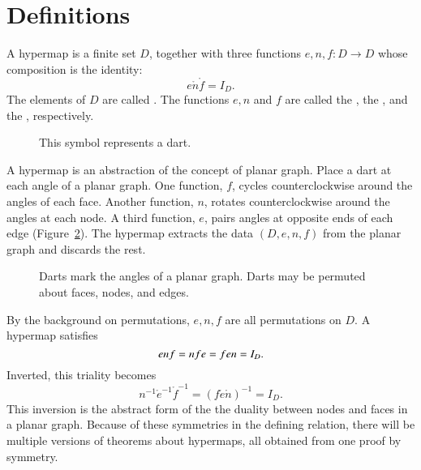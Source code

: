 \section{Definitions}



\begin{definition}\label{def:hypermap}  
  A hypermap is a finite set $D$, together with three functions
  $e,n,f:D\to D$ whose composition is the identity:
  \begin{displaymath}
e\ocirc n\ocirc f = I_D.
\end{displaymath} The
elements of $D$ are called .  The functions $e,n$ and
$f$ are called the , the , and
the , respectively.  %
%
%
%
%
%
%
%
%
\end{definition}

\begin{figure}[htb]
\centering
{}
\caption{This symbol represents a dart.}
\label{fig:dart}
\end{figure}

\begin{remark} A hypermap is an abstraction of
the concept of 
planar graph.  Place a dart at each angle of a planar graph.
One function, $f$, 
cycles counterclockwise around the angles of each face.  
Another function, $n$, 
rotates counterclockwise around the angles at each
node.  A third function, $e$, pairs angles at opposite ends of
each edge  (Figure~\ref{fig:hypermap_ex}).   The hypermap extracts
the data $(D,e,n,f)$ from the planar graph and discards the rest.
%
\end{remark}

\begin{figure}[htb]
\centering
{}
\caption{Darts mark the angles of a planar graph.  Darts may
be permuted about faces, nodes, and edges.}
\label{fig:hypermap_ex}
\end{figure}

By the background on permutations, $e,n,f$ are all permutations on $D$.
A hypermap satisfies 
\begin{equation}\tlabel{eqn:triality}
e \ocirc n\ocirc f = n\ocirc f\ocirc e = f\ocirc e\ocirc n = I_D.
\end{equation}
Inverted, this triality becomes
\begin{displaymath}
n^{-1} \ocirc e^{-1} \ocirc f^{-1} = (f \ocirc e \ocirc n)^{-1} = I_D.
\end{displaymath}
This inversion is the abstract form of the the duality between nodes
and faces in a planar graph.  Because of these symmetries in the
defining relation, there will be multiple versions of theorems about
hypermaps, all obtained from one proof by symmetry.


